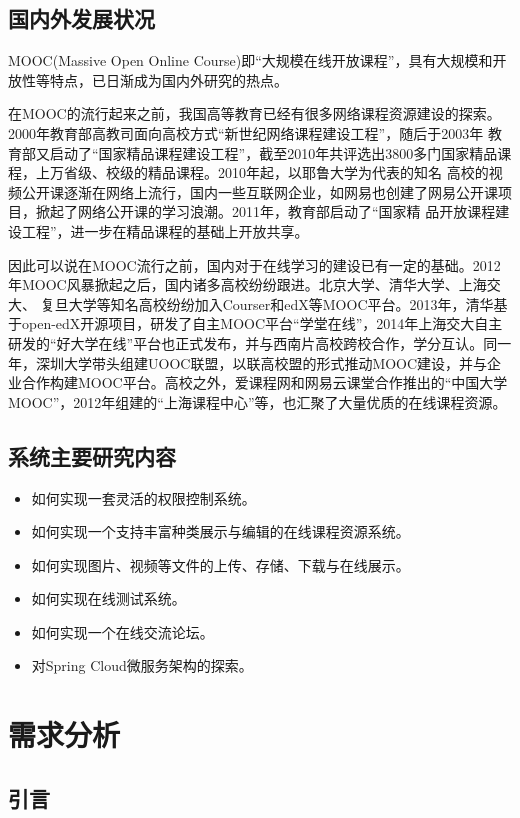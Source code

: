 \documentclass[titlepage,UTF8,linespread=1.5]{ctexart}
\begin{document}
\subsection{国内外发展状况}
MOOC(Massive Open Online Course)即“大规模在线开放课程”，具有大规模和开放性等特点，已日渐成为国内外研究的热点。\par
在MOOC的流行起来之前，我国高等教育已经有很多网络课程资源建设的探索。2000年教育部高教司面向高校方式“新世纪网络课程建设工程”，随后于2003年
教育部又启动了“国家精品课程建设工程”，截至2010年共评选出3800多门国家精品课程，上万省级、校级的精品课程。2010年起，以耶鲁大学为代表的知名
高校的视频公开课逐渐在网络上流行，国内一些互联网企业，如网易也创建了网易公开课项目，掀起了网络公开课的学习浪潮。2011年，教育部启动了“国家精
品开放课程建设工程”，进一步在精品课程的基础上开放共享。\par
因此可以说在MOOC流行之前，国内对于在线学习的建设已有一定的基础。2012年MOOC风暴掀起之后，国内诸多高校纷纷跟进。北京大学、清华大学、上海交大、
复旦大学等知名高校纷纷加入Courser和edX等MOOC平台。2013年，清华基于open-edX开源项目，研发了自主MOOC平台“学堂在线”，2014年上海交大自主
研发的“好大学在线”平台也正式发布，并与西南片高校跨校合作，学分互认。同一年，深圳大学带头组建UOOC联盟，以联高校盟的形式推动MOOC建设，并与企
业合作构建MOOC平台。高校之外，爱课程网和网易云课堂合作推出的“中国大学MOOC”，2012年组建的“上海课程中心”等，也汇聚了大量优质的在线课程资源。
\cite{mooc}\par
\subsection{系统主要研究内容}
\begin{itemize}
    \item 如何实现一套灵活的权限控制系统。
    \item 如何实现一个支持丰富种类展示与编辑的在线课程资源系统。
    \item 如何实现图片、视频等文件的上传、存储、下载与在线展示。
    \item 如何实现在线测试系统。
    \item 如何实现一个在线交流论坛。
    \item 对Spring Cloud微服务架构的探索。
\end{itemize}
\clearpage

\section{需求分析}
\subsection{引言}
\end{document}
